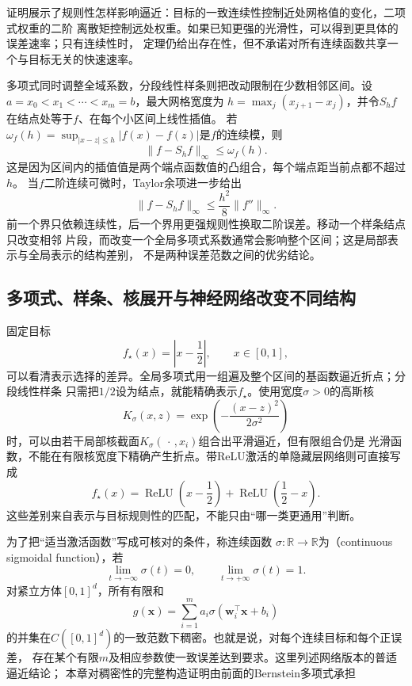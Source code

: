 证明展示了规则性怎样影响逼近：目标的一致连续性控制近处网格值的变化，二项式权重的二阶
离散矩控制远处权重。如果已知更强的光滑性，可以得到更具体的误差速率；只有连续性时，
定理仍给出存在性，但不承诺对所有连续函数共享一个与目标无关的快速速率。

多项式同时调整全域系数，分段线性样条则把改动限制在少数相邻区间。设
$a=x_0<x_1<\cdots<x_m=b$，最大网格宽度为
$h=\max_j(x_{j+1}-x_j)$，并令$S_hf$在结点处等于$f$、在每个小区间上线性插值。
若$\omega_f(h)=\sup_{|x-z|\leq h}|f(x)-f(z)|$是$f$的连续模，则
\[
  \lVert f-S_hf\rVert_\infty\leq\omega_f(h).
\]
这是因为区间内的插值值是两个端点函数值的凸组合，每个端点距当前点都不超过$h$。
当$f$二阶连续可微时，Taylor余项进一步给出
\[
  \lVert f-S_hf\rVert_\infty
  \leq
  \frac{h^2}{8}\lVert f''\rVert_\infty.
\]
前一个界只依赖连续性，后一个界用更强规则性换取二阶误差。移动一个样条结点只改变相邻
片段，而改变一个全局多项式系数通常会影响整个区间；这是局部表示与全局表示的结构差别，
不是两种误差范数之间的优劣结论。

\subsection{多项式、样条、核展开与神经网络改变不同结构}

固定目标
\[
  f_\star(x)=\left|x-\frac12\right|,
  \qquad x\in[0,1],
\]
可以看清表示选择的差异。全局多项式用一组遍及整个区间的基函数逼近折点；分段线性样条
只需把$1/2$设为结点，就能精确表示$f_\star$。使用宽度$\sigma>0$的高斯核
\[
  K_\sigma(x,z)
  =
  \exp\left(-\frac{(x-z)^2}{2\sigma^2}\right)
\]
时，可以由若干局部核截面$K_\sigma(\,\cdot\,,x_i)$组合出平滑逼近，但有限组合仍是
光滑函数，不能在有限核宽度下精确产生折点。带ReLU激活的单隐藏层网络则可直接写成
\[
  f_\star(x)
  =
  \operatorname{ReLU}\left(x-\frac12\right)
  +
  \operatorname{ReLU}\left(\frac12-x\right).
\]
这些差别来自表示与目标规则性的匹配，不能只由“哪一类更通用”判断。

为了把“适当激活函数”写成可核对的条件，称连续函数
$\sigma:\mathbb{R}\to\mathbb{R}$为（continuous sigmoidal
function），若
\[
  \lim_{t\to-\infty}\sigma(t)=0,\qquad
  \lim_{t\to+\infty}\sigma(t)=1.
\]
对紧立方体$[0,1]^d$，所有有限和
\begin{equation}
  g(\bm{x})
  =
  \sum_{i=1}^{m}
  a_i\sigma(\bm{w}_i^{\top}\bm{x}+b_i)
  \label{eq:functional-sigmoidal-network}
\end{equation}
的并集在$C([0,1]^d)$的一致范数下稠密。也就是说，对每个连续目标和每个正误差，
存在某个有限$m$及相应参数使一致误差达到要求。这里列述网络版本的普适逼近结论；
本章对稠密性的完整构造证明由前面的Bernstein多项式承担

